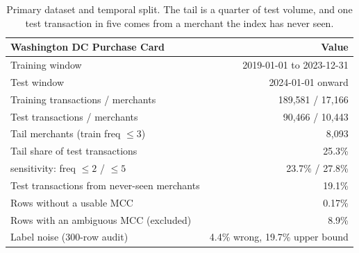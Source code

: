 \begin{table}[t]
\centering
\caption{Primary dataset and temporal split. The tail is a quarter of test volume, and one test transaction in five comes from a merchant the index has never seen.}
\label{tab:datasets}
\begin{tabular}{lr}
\toprule
\textbf{Washington DC Purchase Card} & \textbf{Value}\\
\midrule
Training window & 2019-01-01 to 2023-12-31 \\
Test window & 2024-01-01 onward \\
Training transactions / merchants & 189,581 / 17,166 \\
Test transactions / merchants & 90,466 / 10,443 \\
Tail merchants (train freq $\leq 3$) & 8,093 \\
Tail share of test transactions & 25.3\% \\
\quad sensitivity: freq $\leq 2$ / $\leq 5$ & 23.7\% / 27.8\% \\
Test transactions from never-seen merchants & 19.1\% \\
Rows without a usable MCC & 0.17\% \\
Rows with an ambiguous MCC (excluded) & 8.9\% \\
Label noise (300-row audit) & 4.4\% wrong, 19.7\% upper bound \\
\bottomrule
\end{tabular}
\end{table}
